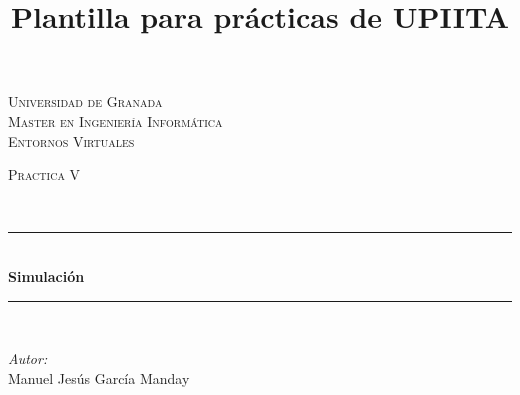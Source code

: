 \documentclass[10pt]{article}
\title{Plantilla para prácticas de UPIITA}
\begin{document}
\begin{center}																		%
\newcommand{\HRule}{\rule{\linewidth}{0.5mm}}									%
\begin{minipage}{0.48\textwidth} \begin{flushleft}
\end{flushleft}\end{minipage}
\begin{minipage}{0.48\textwidth} \begin{flushright}
\end{flushright}\end{minipage}

\vspace*{0.25cm}								%
\textsc{\huge Universidad de Granada}\\[1.5cm]	

\textsc{\LARGE Master en Ingeniería Informática}\\[1.5cm]													%

\textsc{\LARGE Entornos Virtuales}\\[1.5cm]													%

\begin{minipage}{0.9\textwidth} 
\begin{center}																					%
\textsc{\LARGE Practica V}
\end{center}
\end{minipage}\\[0.5cm]
 			\vspace*{1cm}																		%
\HRule \\[0.4cm]																	%
{ \huge \bfseries Simulación}\\[0.4cm]	%
\HRule \\[1.5cm]																	%
\begin{minipage}{0.46\textwidth}													%
\begin{flushleft} \large															%
\emph{Autor:}\\	
 Manuel Jesús García Manday
\end{flushleft}																		%
\end{minipage}		
\begin{minipage}{0.52\textwidth}		
\vspace{-0.6cm}											%
\begin{flushright} \large															%
\end{flushright}																	%
\end{minipage}	
\vspace*{1cm}
 	

\end{center}
\end{document}
